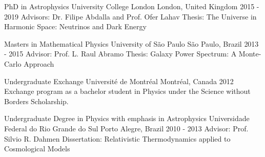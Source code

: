 

\begin{cventries}

 \cventry
    {PhD in Astrophysics} %
    {University College London} %
    {London, United Kingdom} %
    {2015 - 2019} %
    {
    Advisors: Dr. Filipe Abdalla and Prof. Ofer Lahav \linebreak
    Thesis: The Universe in Harmonic Space: Neutrinos and Dark Energy
    }
    
\cventry
    {Masters in Mathematical Physics} %
    {University of S\~{a}o Paulo} %
    {S\~{a}o Paulo, Brazil} %
    {2013 - 2015} %
    {
    Advisor: Prof. L. Raul Abramo \linebreak
    Thesis: Galaxy Power Spectrum: A Monte-Carlo Approach
    }
    
\cventry
    {Undergraduate Exchange} %
    {Universit\'{e} de Montr\'{e}al} %
    {Montr\'{e}al, Canada} %
    {2012} %
    {
    Exchange program as a bachelor student in Physics under the Science without Borders Scholarship.
    }

\cventry
    {Undergraduate Degree in Physics with emphasis in Astrophysics} %
    {Universidade Federal do Rio Grande do Sul} %
    {Porto Alegre, Brazil} %
    {2010 - 2013} %
    {
    Advisor: Prof. Silvio R. Dahmen\linebreak
    Dissertation: Relativistic Thermodynamics applied to Cosmological Models
    }
\end{cventries}

